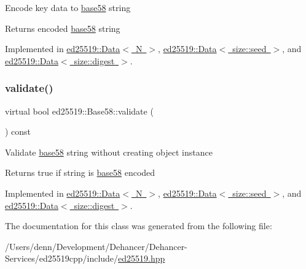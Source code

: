 Encode key data to \mbox{\hyperlink{namespaceed25519_1_1base58}{base58}} string \begin{DoxyReturn}{Returns}
encoded \mbox{\hyperlink{namespaceed25519_1_1base58}{base58}} string 
\end{DoxyReturn}


Implemented in \mbox{\hyperlink{classed25519_1_1_data_a2dc2e23b950a10b168d7509a63ffca53}{ed25519\+::\+Data$<$ N $>$}}, \mbox{\hyperlink{classed25519_1_1_data_a2dc2e23b950a10b168d7509a63ffca53}{ed25519\+::\+Data$<$ size\+::seed $>$}}, and \mbox{\hyperlink{classed25519_1_1_data_a2dc2e23b950a10b168d7509a63ffca53}{ed25519\+::\+Data$<$ size\+::digest $>$}}.

\mbox{\label{classed25519_1_1_base58_addfdb1d6d0f7e7f0cd0cf5dd2ee193bb}} 
\subsubsection{\texorpdfstring{validate()}{validate()}}
{\footnotesize\ttfamily virtual bool ed25519\+::\+Base58\+::validate (\begin{DoxyParamCaption}{ }\end{DoxyParamCaption}) const\hspace{0.3cm}{\ttfamily [pure virtual]}}

Validate \mbox{\hyperlink{namespaceed25519_1_1base58}{base58}} string without creating object instance \begin{DoxyReturn}{Returns}
true if string is \mbox{\hyperlink{namespaceed25519_1_1base58}{base58}} encoded 
\end{DoxyReturn}


Implemented in \mbox{\hyperlink{classed25519_1_1_data_ac365c9862b45379c677449b622c74da5}{ed25519\+::\+Data$<$ N $>$}}, \mbox{\hyperlink{classed25519_1_1_data_ac365c9862b45379c677449b622c74da5}{ed25519\+::\+Data$<$ size\+::seed $>$}}, and \mbox{\hyperlink{classed25519_1_1_data_ac365c9862b45379c677449b622c74da5}{ed25519\+::\+Data$<$ size\+::digest $>$}}.



The documentation for this class was generated from the following file\+:\begin{DoxyCompactItemize}
\item 
/\+Users/denn/\+Development/\+Dehancer/\+Dehancer-\/\+Services/ed25519cpp/include/\mbox{\hyperlink{ed25519_8hpp}{ed25519.\+hpp}}\end{DoxyCompactItemize}
